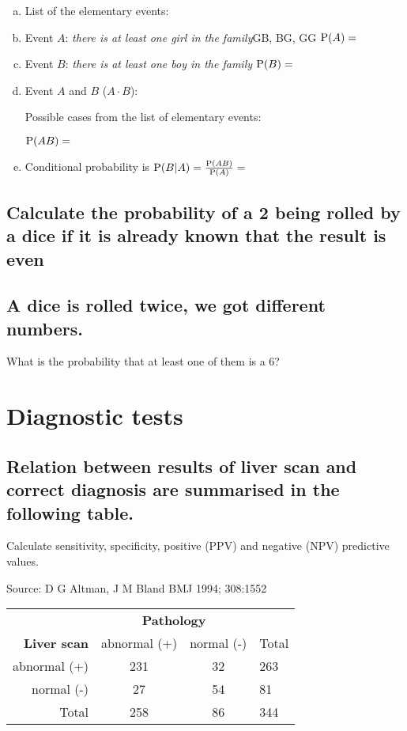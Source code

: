  	
\begin{enumerate}[a)]
\item List of the elementary events: \hrulefill
\item Event $A$: \emph{there is at least one girl in the family}\quad GB, BG, GG
	\qquad
	$\P(A) =$ 	\hrulefill
\item Event $B$: \emph{there is at least one boy in the family}\quad \hrulefill
	\qquad
	$\P(B) =$ 	\hrulefill
\item Event $A$ and $B$ ($A\cdot B$): \hrulefill
	
	Possible cases from the list of elementary events: \hrulefill	
	
	$\P(AB) =$ 	\hrulefill


\item Conditional probability is $\P(B|A)= \frac{\P(AB)}{\P(A)} =$ \hrulefill	
\end{enumerate}


\subsection[Probability of 2 being rolled if the reult is even]{Calculate the probability of a 2 being rolled by a dice if it is already known that the result is even}

\noindent\hrulefill
\subsection{A dice is rolled twice, we got different numbers.}
What is the probability that at least one of them is a 6?



\noindent\hrulefill


\section{Diagnostic tests}
\subsection{Relation between results of liver scan and correct diagnosis are summarised in the following table.}
 Calculate sensitivity, specificity, positive (PPV) and negative (NPV) predictive values.

\hfill Source: D G Altman, J M Bland BMJ 1994; 308:1552


\begin{center}
	\begin{tabular}{r|cc|l}
	\toprule
			& \multicolumn{2}{c|}{\textbf{Pathology}}\\
	\textbf{Liver scan}	& abnormal (+)	& normal (-)	&Total\\
	\midrule
	abnormal (+) &	231	&32	&263\\
	normal (-)&	27	&54	&81\\
	\midrule
	Total		&258&	86	&344\\
	\bottomrule	
	\end{tabular}
\end{center}

